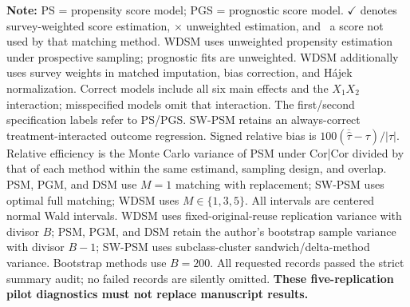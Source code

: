 \begin{table}
\begin{tabular}{@{} >{\centering\arraybackslash}p{1.3cm} l c c *{4}{c} *{4}{c} *{4}{c} @{}}
\bottomrule
\end{tabular}
\vspace{0.5em}
\begin{minipage}{\textwidth}
\footnotesize
\textbf{Note:} PS = propensity score model; PGS = prognostic score model. $\checkmark$ denotes survey-weighted score estimation, $\times$ unweighted estimation, and \textendash\, a score not used by that matching method. WDSM uses unweighted propensity estimation under prospective sampling; prognostic fits are unweighted. WDSM additionally uses survey weights in matched imputation, bias correction, and H\'ajek normalization. Correct models include all six main effects and the $X_1X_2$ interaction; misspecified models omit that interaction. The first/second specification labels refer to PS/PGS. SW-PSM retains an always-correct treatment-interacted outcome regression. Signed relative bias is $100(\overline{\widehat\tau}-\tau)/|\tau|$. Relative efficiency is the Monte Carlo variance of PSM under Cor|Cor divided by that of each method within the same estimand, sampling design, and overlap. PSM, PGM, and DSM use $M=1$ matching with replacement; SW-PSM uses optimal full matching; WDSM uses $M\in\{1,3,5\}$. All intervals are centered normal Wald intervals. WDSM uses fixed-original-reuse replication variance with divisor $B$; PSM, PGM, and DSM retain the author's bootstrap sample variance with divisor $B-1$; SW-PSM uses subclass-cluster sandwich/delta-method variance. Bootstrap methods use $B=200$. All requested records passed the strict summary audit; no failed records are silently omitted. \textbf{These five-replication pilot diagnostics must not replace manuscript results.}
\end{minipage}
\end{table}
